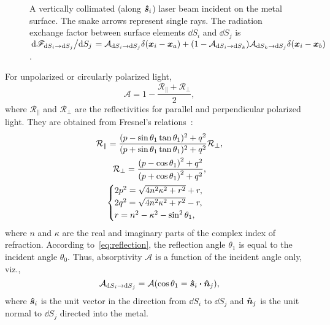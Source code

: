 \documentclass[final]{elsarticle} %
\newcommand{\Abso}{\mathcal{A}}
\newcommand{\Refl}{\mathcal{R}}
\newcommand{\viewfactor}[3]{{#1}_{\dd{S}#2\to\dd{S}#3}}
\newcommand{\bn}{\vu*{n}}
\newcommand{\bs}{\vu*{s}}
\newcommand{\bx}{\vb*{x}}
\begin{document}
\begin{figure}
    \caption{
        A vertically collimated (along $\bs_i$) laser beam incident on the metal surface.
        The snake arrows represent single rays.
        The radiation exchange factor between surface elements $\dd{S_i}$ and $\dd{S_j}$ is
        $\dv*{\viewfactor{\mathscr{F}}{_i}{_j}}{S_j} = \viewfactor{\Abso}{_i}{_j}\delta(\bx_i-\bx_a)
            + (1-\viewfactor{\Abso}{_i}{_k})\viewfactor{\Abso}{_k}{_j}\delta(\bx_i-\bx_b)$.
    }
    \label{fig:exchange_factor}
\end{figure}


For unpolarized or circularly polarized light,
\begin{equation}\label{eq:A}
    \Abso = 1 - \frac{\Refl_\parallel + \Refl_\perp}2,
\end{equation}
where $\Refl_\parallel$ and $\Refl_\perp$ are the reflectivities for parallel and perpendicular polarized light.
They are obtained from Fresnel's relations~\cite{modest2013radiative}:
\begin{gather}
    \Refl_\parallel = \frac{(p - \sin\theta_1\tan\theta_1)^2 + q^2}
        {(p + \sin\theta_1\tan\theta_1)^2 + q^2}\Refl_\perp, \label{eq:Rparallel}\\
    \Refl_\perp = \frac{\qty(p-\cos\theta_1)^2 + q^2}{\qty(p+\cos\theta_1)^2 + q^2}, \label{eq:Rperp}\\
    \begin{cases}
        2p^2 = \sqrt{4n^2\kappa^2 + r^2} + r, \\
        2q^2 = \sqrt{4n^2\kappa^2 + r^2} - r, \\
        r = n^2 - \kappa^2 - \sin^2\theta_1,
    \end{cases} \label{eq:pqr}
\end{gather}
where $n$ and $\kappa$ are the real and imaginary parts of the complex index of refraction.
According to~\eqref{eq:reflection}, the reflection angle $\theta_1$
is equal to the incident angle $\theta_0$.
Thus, absorptivity $\Abso$ is a function of the incident angle only, viz.,
\begin{equation}\label{eq:Aij}
    \viewfactor{\Abso}{_i}{_j} = \Abso(\cos\theta_1 = \bs_i\vdot\bn_j),
\end{equation}
where $\bs_i$ is the unit vector in the direction from $\dd{S_i}$ to $\dd{S_j}$
and $\bn_j$ is the unit normal to $\dd{S_j}$ directed into the metal.
\end{document}
